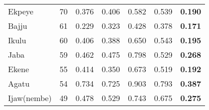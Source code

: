 \documentclass[11pt,a4paper]{article}
\begin{document}
\begin{table}
\begin{tabular}{l|l|l|l|l|l|l}
Ekpeye        &    70 &                                                                  0.376 &  0.406 &  0.582 &  0.539 &                                                                                          \textbf{0.190} \\
Bajju         &    61 &                                                                                       0.229 &  0.323 &  0.428 &  0.378 &                                                                                        \textbf{0.171} \\
Ikulu         &    60 &                                                                                      0.406 &  0.388 &  0.650 &  0.543 &                                                                                        \textbf{0.195} \\
Jaba          &    59 &                                                                                   0.462 &  0.475 &  0.798 &  0.529 &                                                                                         \textbf{0.268} \\
Ekene         &    55 &                                                                                       0.414 &  0.350 &  0.673 &  0.519 &                                                                                         \textbf{0.192} \\
Agatu         &    54 &                                                                              0.734 &  0.725 &  0.903 &  0.793 &                                                                                      \textbf{0.387} \\
Ijaw(nembe)     &    49 &                                                                                       0.478 &  0.529 &  0.743 &  0.675 &                                                                                         \textbf{0.275} \\


\end{tabular}
\end{table}
\end{document}
